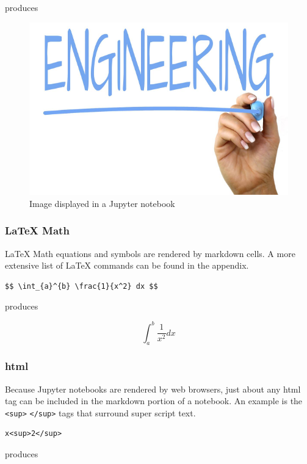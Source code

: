 \documentclass{book}
\makeatletter
\def\maxwidth{\ifdim\Gin@nat@width>\linewidth\linewidth
    \else\Gin@nat@width\fi}
\let\Oldincludegraphics\includegraphics
\renewcommand{\includegraphics}[1]{\Oldincludegraphics[width=.8\maxwidth]{#1}}
\makeatother
\begin{document}
produces

\begin{figure}
\centering
\includegraphics{images/engineering.png}
\caption{Image displayed in a Jupyter notebook}
\end{figure}

\subsubsection{LaTeX Math}\label{latex-math}

LaTeX Math equations and symbols are rendered by markdown cells. A more
extensive list of LaTeX commands can be found in the appendix.

\begin{lstlisting}
$$ \int_{a}^{b} \frac{1}{x^2} dx $$
\end{lstlisting}

produces

\[ \int_{a}^{b} \frac{1}{x^2} dx \]

\subsubsection{html}\label{html}

Because Jupyter notebooks are rendered by web browsers, just about any
html tag can be included in the markdown portion of a notebook. An
example is the \lstinline!<sup>! \lstinline!</sup>! tags that surround
super script text.

\begin{lstlisting}
x<sup>2</sup>
\end{lstlisting}

produces
\end{document}
